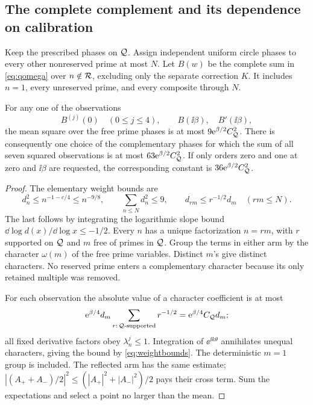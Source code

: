 \subsection{The complete complement and its dependence on calibration}

Keep the prescribed phases on \(\mathcal Q\). Assign independent uniform circle
phases to every other nonreserved prime at most \(N\). Let \(B(w)\)
be the complete sum in \eqref{eq:qomega} over \(n\notin\mathcal R\), excluding
only the separate correction \(K\). It includes \(n=1\), every
unreserved prime, and every composite through \(N\).

\begin{lemma}\label{lem:complement}
For any one of the observations
\[
 B^{(j)}(0)\quad(0\le j\le4),\qquad B(\ii\beta),\quad B'(\ii\beta),
\]
the mean square over the free prime phases is at most
\(9\mathrm e^{\beta/2}C_{\mathcal Q}^2\).
There is consequently one choice of the complementary phases for which
the sum of all seven squared observations is at most
\(63\mathrm e^{\beta/2}C_{\mathcal Q}^2\). If only orders zero and one at zero
and \(\ii\beta\) are requested, the corresponding constant is
\(36\mathrm e^{\beta/2}C_{\mathcal Q}^2\).
\end{lemma}
\begin{proof}
The elementary weight bounds are
\begin{equation}\label{eq:weightbounds}
 d_n^2\le n^{-1-c/4}\le n^{-9/8},\qquad
 \sum_{n\le N}d_n^2\le9,\qquad d_{rm}\le r^{-1/2}d_m
 \quad(rm\le N).
\end{equation}
The last follows by integrating the logarithmic slope bound
\(\dd\log d(x)/\dd\log x\le-1/2\).
Every \(n\) has a unique factorization \(n=rm\), with \(r\)
supported on \(\mathcal Q\) and \(m\) free of primes in \(\mathcal Q\).
Group the terms in either arm by the character \(\omega(m)\) of the
free prime variables. Distinct \(m\)'s give distinct characters.
No reserved prime enters a complementary character because its only
retained multiple was removed.

For each observation the absolute value of a character coefficient is
at most
\[
 \mathrm e^{\beta/4}d_m
       \sum_{r:\,\mathcal Q\text{-supported}}r^{-1/2}
 =\mathrm e^{\beta/4}C_{\mathcal Q}d_m;
\]
all fixed derivative factors obey \(\lambda_n^j\le1\).
Integration of \(\ee^{\ii k\theta}\) annihilates unequal characters,
giving the bound by \eqref{eq:weightbounds}. The deterministic
\(m=1\) group is included. The reflected arm has the same estimate;
\(|(A_++A_-)/2|^2\le(|A_+|^2+|A_-|^2)/2\) pays their cross term.
Sum the expectations and select a point no larger than the mean.
\end{proof}

